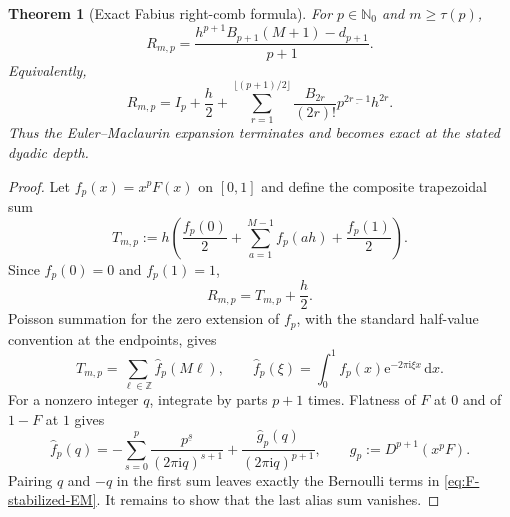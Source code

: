 \documentclass[11pt]{article}
\newtheorem{theorem}{Theorem}[section]
\theoremstyle{definition}
\newcommand{\dd}{\,\mathrm{d}}
\newcommand{\e}{\mathrm{e}}
\newcommand{\ii}{\mathrm{i}}
\newcommand{\Z}{\mathbb{Z}}
\newcommand{\N}{\mathbb{N}}
\newcommand{\fall}[2]{#1^{\underline{#2}}}
\begin{document}
\begin{theorem}[Exact Fabius right-comb formula]
\label{thm:F-stabilization}
For $p\in\N_0$ and $m\ge\tau(p)$,
\begin{equation}
 \boxed{
 R_{m,p}
 =\frac{h^{p+1}B_{p+1}(M+1)-d_{p+1}}{p+1}.}
 \label{eq:F-stabilized-Bernoulli}
\end{equation}
Equivalently,
\begin{equation}
 R_{m,p}
 =I_p+\frac h2
 +\sum_{r=1}^{\lfloor(p+1)/2\rfloor}
 \frac{B_{2r}}{(2r)!}\fall p{2r-1}h^{2r}.
 \label{eq:F-stabilized-EM}
\end{equation}
Thus the Euler--Maclaurin expansion terminates and becomes exact at the stated
dyadic depth.
\end{theorem}

\begin{proof}
Let $f_p(x)=x^pF(x)$ on $[0,1]$ and define the composite trapezoidal sum
\[
 T_{m,p}:=h\left(\frac{f_p(0)}2+
 \sum_{a=1}^{M-1}f_p(ah)+\frac{f_p(1)}2\right).
\]
Since $f_p(0)=0$ and $f_p(1)=1$,
\begin{equation}
 R_{m,p}=T_{m,p}+\frac h2.
 \label{eq:R-vs-T}
\end{equation}
Poisson summation for the zero extension of $f_p$, with the standard
half-value convention at the endpoints, gives
\[
 T_{m,p}=\sum_{\ell\in\Z}\widehat f_p(M\ell),
 \qquad
 \widehat f_p(\xi)=\int_0^1f_p(x)\e^{-2\pi\ii\xi x}\dd x.
\]
For a nonzero integer $q$, integrate by parts $p+1$ times.  Flatness of $F$ at
$0$ and of $1-F$ at $1$ gives
\begin{equation}
 \widehat f_p(q)
 =-\sum_{s=0}^{p}\frac{\fall p s}{(2\pi\ii q)^{s+1}}
 +\frac{\widehat g_p(q)}{(2\pi\ii q)^{p+1}},
 \qquad
 g_p:=D^{p+1}(x^pF).
 \label{eq:IBP-Fourier}
\end{equation}
Pairing $q$ and $-q$ in the first sum leaves exactly the Bernoulli terms in
\eqref{eq:F-stabilized-EM}.  It remains to show that the last alias sum
vanishes.


\end{proof}
\end{document}
